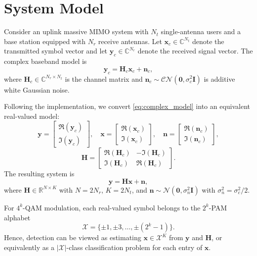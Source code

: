 \documentclass[conference]{IEEEtran}
\begin{document}
\section{System Model}

Consider an uplink massive MIMO system with $N_t$ single-antenna users and a base station equipped with $N_r$ receive antennas. Let $\mathbf{x}_c \in \mathbb{C}^{N_t}$ denote the transmitted symbol vector and let $\mathbf{y}_c \in \mathbb{C}^{N_r}$ denote the received signal vector. The complex baseband model is
\begin{equation}
\mathbf{y}_c = \mathbf{H}_c \mathbf{x}_c + \mathbf{n}_c,
\label{eq:complex_model}
\end{equation}
where $\mathbf{H}_c \in \mathbb{C}^{N_r \times N_t}$ is the channel matrix and $\mathbf{n}_c \sim \mathcal{CN}(\mathbf{0}, \sigma_c^2 \mathbf{I})$ is additive white Gaussian noise.

Following the implementation, we convert \eqref{eq:complex_model} into an equivalent real-valued model:
\begin{equation}
\mathbf{y}=
\begin{bmatrix}
\Re(\mathbf{y}_c)\\
\Im(\mathbf{y}_c)
\end{bmatrix},\quad
\mathbf{x}=
\begin{bmatrix}
\Re(\mathbf{x}_c)\\
\Im(\mathbf{x}_c)
\end{bmatrix},\quad
\mathbf{n}=
\begin{bmatrix}
\Re(\mathbf{n}_c)\\
\Im(\mathbf{n}_c)
\end{bmatrix},
\end{equation}
\begin{equation}
\mathbf{H}=
\begin{bmatrix}
\Re(\mathbf{H}_c) & -\Im(\mathbf{H}_c)\\
\Im(\mathbf{H}_c) & \Re(\mathbf{H}_c)
\end{bmatrix}.
\end{equation}
The resulting system is
\begin{equation}
\mathbf{y} = \mathbf{H}\mathbf{x} + \mathbf{n},
\label{eq:real_model}
\end{equation}
where $\mathbf{H}\in\mathbb{R}^{N\times K}$ with $N=2N_r$, $K=2N_t$, and $\mathbf{n}\sim \mathcal{N}(\mathbf{0}, \sigma_n^2 \mathbf{I})$ with $\sigma_n^2=\sigma_c^2/2$.

For $4^k$-QAM modulation, each real-valued symbol belongs to the $2^k$-PAM alphabet
\begin{equation}
\mathcal{X} = \{\pm 1, \pm 3, \ldots, \pm (2^k-1)\}.
\label{eq:alphabet}
\end{equation}
Hence, detection can be viewed as estimating $\mathbf{x}\in\mathcal{X}^K$ from $\mathbf{y}$ and $\mathbf{H}$, or equivalently as a $|\mathcal{X}|$-class classification problem for each entry of $\mathbf{x}$.
\end{document}
